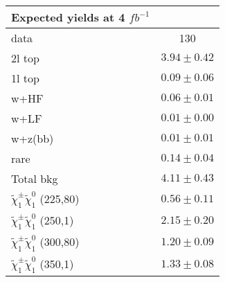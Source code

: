 \begin{table}
\begin{center}
\begin{tabular}{lc}
Expected yields at 4 $fb^{-1}$ & \\
\hline
data&130\\
\hline
2l top&$3.94\pm0.42$\\
1l top&$0.09\pm0.06$\\
w+HF&$0.06\pm0.01$\\
w+LF&$0.01\pm0.00$\\
w+z(bb)&$0.01\pm0.01$\\
rare&$0.14\pm0.04$\\
\hline
Total bkg&$4.11\pm0.43$\\
\hline
$\tilde{\chi}_{1}^{\pm}\tilde{\chi}_{1}^{0}$ (225,80)&$0.56\pm0.11$\\
$\tilde{\chi}_{1}^{\pm}\tilde{\chi}_{1}^{0}$ (250,1)&$2.15\pm0.20$\\
$\tilde{\chi}_{1}^{\pm}\tilde{\chi}_{1}^{0}$ (300,80)&$1.20\pm0.09$\\
$\tilde{\chi}_{1}^{\pm}\tilde{\chi}_{1}^{0}$ (350,1)&$1.33\pm0.08$\\
\hline
\hline
\end{tabular}
\end{center}
\end{table}
